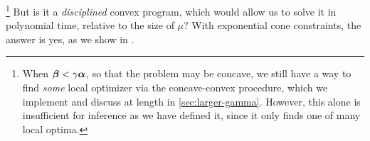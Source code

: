\documentclass[twoside]{article}
\begin{document}
\footnote{
    When $\boldsymbol\beta < \gamma \boldsymbol\alpha$,
    so that the problem may be concave,
    we still have a way to find \emph{some} local optimizer via the concave-convex procedure, which we implement and discuss at length in \cref{sec:larger-gamma}.
    However, this alone is insufficient for inference as we have defined it,
    since it only finds one of many local optima. 
    }
But is it a \emph{disciplined} convex program, which would allow us to solve it in polynomial time, relative to the size of $\mu$?
% 
With exponential cone constraints,
the answer is yes, as we show in .
\end{document}
